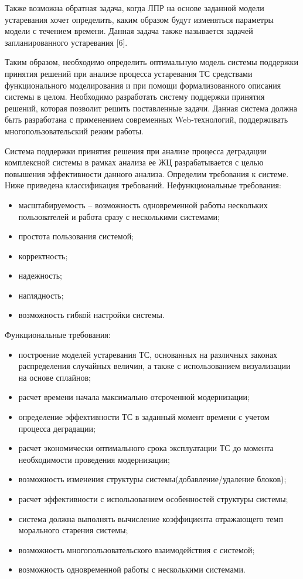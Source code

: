 Также возможна обратная задача, когда ЛПР на основе заданной модели устаревания хочет определить, каким образом будут изменяться параметры модели с течением времени. 
Данная задача также называется задачей запланированного устаревания [6].

Таким образом, необходимо определить оптимальную модель системы поддержки принятия решений при анализе процесса устаревания ТС средствами функционального моделирования и при помощи формализованного описания системы в целом. 
Необходимо разработать систему поддержки принятия решений, которая позволит решить поставленные задачи. 
Данная система должна быть разработана с применением современных Web-технологий, поддерживать многопользовательский режим работы.

Система поддержки принятия решения при анализе процесса деградации комплексной системы в рамках анализа ее ЖЦ разрабатывается с целью повышения эффективности данного анализа. 
Определим требования к системе. Ниже приведена классификация требований.
Нефункциональные требования:
\begin{itemize}
    \item масштабируемость – возможность одновременной работы нескольких пользователей и работа сразу с несколькими системами;
    \item простота пользования системой; 
    \item корректность;
    \item надежность;
    \item наглядность;
    \item возможность гибкой настройки системы.
\end{itemize}
Функциональные требования:
\begin{itemize}
    \item построение моделей устаревания ТС, основанных на различных законах распределения случайных величин, а также с использованием визуализации на основе сплайнов;
    \item расчет времени начала максимально отсроченной модернизации;
    \item определение эффективности ТС в заданный момент времени с учетом процесса деградации;
    \item расчет экономически оптимального срока эксплуатации ТС до момента необходимости проведения модернизации;
    \item возможность изменения структуры системы(добавление/удаление блоков);
    \item расчет эффективности с использованием особенностей структуры системы;
    \item система должна выполнять вычисление коэффициента отражающего темп морального старения системы;
    \item возможность многопользовательского взаимодействия с системой;
    \item возможность одновременной работы с несколькими системами.
\end{itemize}

